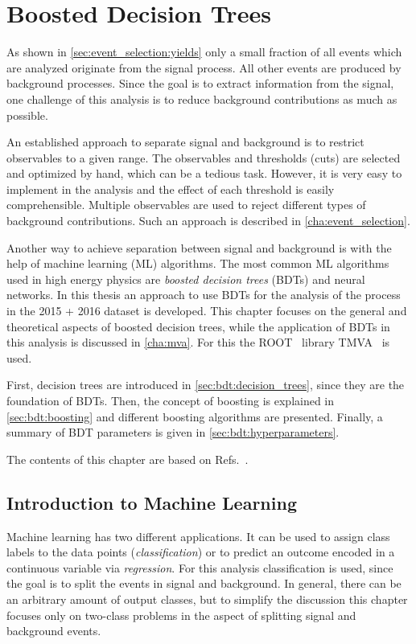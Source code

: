 \chapter{Boosted Decision Trees}\label{cha:bdt}

As shown in \cref{sec:event_selection:yields} only a small fraction of all events which are analyzed originate
from the signal process.
All other events are produced by background processes.
Since the goal is to extract information from the signal, one challenge of this analysis is to reduce
background contributions as much as possible.

An established approach to separate signal and background is to restrict observables to a given range.
The observables and thresholds (cuts) are selected and optimized by hand, which can be a tedious task.
However, it is very easy to implement in the analysis and the effect of each threshold is easily comprehensible.
Multiple observables are used to reject different types of background contributions.
Such an approach is described in \cref{cha:event_selection}.

Another way to achieve separation between signal and background is with the help of machine learning (ML) algorithms.
The most common ML algorithms used in high energy physics are \emph{boosted decision trees} (BDTs) and neural networks.
In this thesis an approach to use BDTs for the analysis of the \Httll{} process in the 2015 + 2016 dataset is developed.
This chapter focuses on the general and theoretical aspects of boosted decision trees, while the application of BDTs in this analysis
is discussed in \cref{cha:mva}. For this the ROOT~\cite{ROOT} library TMVA~\cite{TMVA} is used.

First, decision trees are introduced in \cref{sec:bdt:decision_trees}, since they are the foundation of BDTs.
Then, the concept of boosting is explained in \cref{sec:bdt:boosting} and different boosting algorithms are presented.
Finally, a summary of BDT parameters is given in \cref{sec:bdt:hyperparameters}.

The contents of this chapter are based on Refs.~\cite{Hastie2009,TMVA}.

\section{Introduction to Machine Learning}\label{sec:bdt:intro}

Machine learning has two different applications.
It can be used to assign class labels to the data points (\emph{classification}) or to predict
an outcome encoded in a continuous variable via \emph{regression}.
For this analysis classification is used, since the goal is to split the events in signal and background.
In general, there can be an arbitrary amount of output classes, but to simplify the discussion this chapter focuses
only on two-class problems in the aspect of splitting signal and background events.

